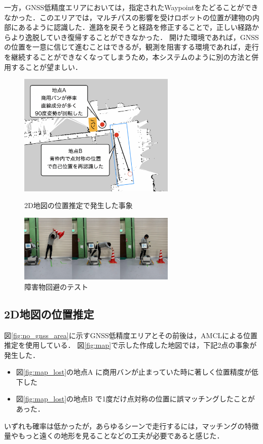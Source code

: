 \documentclass[platex,dvipdfmx]{rbproceedings}
\begin{document}
一方，GNSS低精度エリアにおいては，指定されたWaypointをたどることができなかった．このエリアでは，マルチパスの影響を受けロボットの位置が建物の内部にあるように認識した．進路を戻そうと経路を修正することで，正しい経路からより逸脱していき復帰することができなかった．
開けた環境であれば，GNSSの位置を一意に信じて進むことはできるが，観測を阻害する環境であれば，走行を継続することができなくなってしまうため，本システムのように別の方法と併用することが望ましい．

\begin{figure}[htbp]
   \centering
   \begin{minipage}[b]{.45\linewidth}
       \centering   
       \includegraphics[keepaspectratio,width=75mm]{fig/map_lost.png}
       \caption{2D地図の位置推定で発生した事象}
       \label{fig:map_lost}
   \end{minipage}
   \begin{minipage}[b]{.45\linewidth}
       \centering
       \includegraphics[keepaspectratio,width=75mm]{fig/avoidance.png}
       \caption{障害物回避のテスト}
       \label{fig:avoidance_test}
   \end{minipage}
\end{figure}

\subsection{2D地図の位置推定}
図\ref{fig:no_gnss_area}に示すGNSS低精度エリアとその前後は，AMCLによる位置推定を使用している．
図\ref{fig:map}で示した作成した地図では，下記2点の事象が発生した．
\begin{itemize}
    \item 図\ref{fig:map_lost}の地点A に商用バンが止まっていた時に著しく位置精度が低下した
    \item 図\ref{fig:map_lost}の地点B で1度だけ点対称の位置に誤マッチングしたことがあった．
\end{itemize}
いずれも確率は低かったが，あらゆるシーンで走行するには，マッチングの特徴量やもっと遠くの地形を見ることなどの工夫が必要であると感じた．
\end{document}
